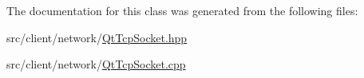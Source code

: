 The documentation for this class was generated from the following files\+:\begin{DoxyCompactItemize}
\item 
src/client/network/\mbox{\hyperlink{_qt_tcp_socket_8hpp}{Qt\+Tcp\+Socket.\+hpp}}\item 
src/client/network/\mbox{\hyperlink{_qt_tcp_socket_8cpp}{Qt\+Tcp\+Socket.\+cpp}}\end{DoxyCompactItemize}
